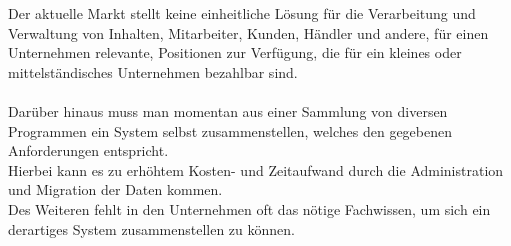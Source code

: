 Der aktuelle Markt stellt keine einheitliche Lösung für die Verarbeitung und Verwaltung von Inhalten, Mitarbeiter, Kunden, Händler und andere, für einen Unternehmen relevante, Positionen zur Verfügung, die für ein kleines oder mittelständisches Unternehmen bezahlbar sind.\\
\\
Darüber hinaus muss man momentan aus einer Sammlung von diversen Programmen ein System selbst zusammenstellen, welches den gegebenen Anforderungen entspricht.\\
Hierbei kann es zu erhöhtem Kosten- und Zeitaufwand durch die Administration und Migration der Daten kommen.\\
Des Weiteren fehlt in den Unternehmen oft das nötige Fachwissen, um sich ein derartiges System zusammenstellen zu können.
